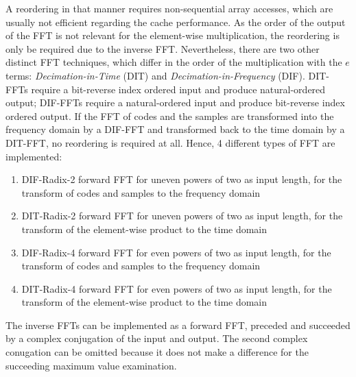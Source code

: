A reordering in that manner requires non-sequential array accesses, which are usually not efficient regarding the cache performance. As the order of the output of the FFT is not relevant for the element-wise multiplication, the reordering is only be required due to the inverse FFT. Nevertheless, there are two other distinct FFT techniques, which differ in the order of the multiplication with the $e$ terms: \emph{Decimation-in-Time} (DIT) and \emph{Decimation-in-Frequency} (DIF). DIT-FFTs require a bit-reverse index ordered input and produce natural-ordered output; DIF-FFTs require a natural-ordered input and produce bit-reverse index ordered output. If the FFT of codes and the samples are transformed into the frequency domain by a DIF-FFT and transformed back to the time domain by a DIT-FFT, no reordering is required at all. Hence, 4 different types of FFT are implemented:

\begin{enumerate}
    \item DIF-Radix-2 forward FFT for uneven powers of two as input length, for the transform of codes and samples to the frequency domain
    \item DIT-Radix-2 forward FFT for uneven powers of two as input length, for the transform of the element-wise product to the time domain
    \item DIF-Radix-4 forward FFT for even powers of two as input length, for the transform of codes and samples to the frequency domain
    \item DIT-Radix-4 forward FFT for even powers of two as input length, for the transform of the element-wise product to the time domain
\end{enumerate}

The inverse FFTs can be implemented as a forward FFT, preceded and succeeded by a complex conjugation of the input and output. The second complex conugation can be omitted because it does not make a difference for the succeeding maximum value examination.

